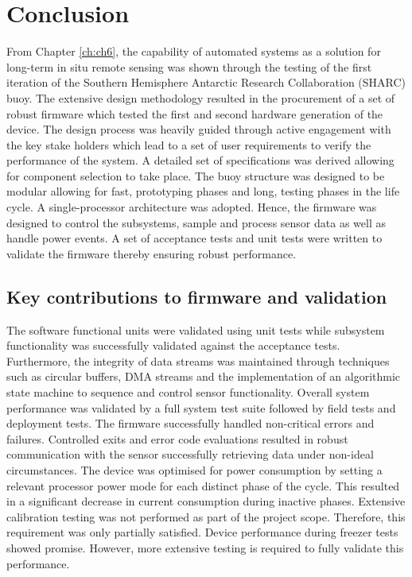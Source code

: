 

\chapter{Conclusion}
\label{ch:conclusion}
From Chapter \ref{ch:ch6}, the capability of automated systems as a solution for long-term in situ remote sensing was shown through the testing of the first iteration of the Southern Hemisphere Antarctic Research Collaboration (SHARC) buoy. The extensive design methodology resulted in the procurement of a set of robust firmware which tested the first and second hardware generation of the device. The design process was heavily guided through active engagement with the key stake holders which lead to a set of user requirements to verify the performance of the system. A detailed set of specifications was derived allowing for component selection to take place. The buoy structure was designed to be modular allowing for fast, prototyping phases and long, testing phases in the life cycle. A single-processor architecture was adopted. Hence, the firmware was designed to control the subsystems, sample and process sensor data as well as handle power events. A set of acceptance tests and unit tests were written to validate the firmware thereby ensuring robust performance.

\section{Key contributions to firmware and validation}

The software functional units were validated using unit tests while subsystem functionality was successfully validated against the acceptance tests. Furthermore, the integrity of data streams was maintained through techniques such as circular buffers, DMA streams and the implementation of an algorithmic state machine to sequence and control sensor functionality. Overall system performance was validated by a full system test suite  followed by field tests and deployment tests. The firmware successfully handled non-critical errors and failures. Controlled exits and error code evaluations resulted in robust communication with the sensor successfully retrieving data under non-ideal circumstances. The device was optimised for power consumption by setting a relevant processor power mode for each distinct phase of the cycle. This resulted in a significant decrease in current consumption during inactive phases. Extensive calibration testing was not performed as part of the project scope. Therefore, this requirement was only partially satisfied. Device performance during freezer tests showed promise. However, more extensive testing is required to fully validate this performance.

